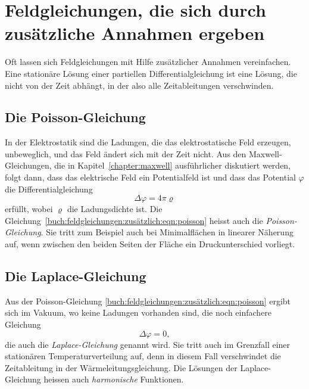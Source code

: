 %
%
\section{Feldgleichungen, die sich durch zusätzliche Annahmen ergeben}
Oft lassen sich Feldgleichungen mit Hilfe zusätzlicher Annahmen
vereinfachen.
Eine stationäre Lösung einer partiellen Differentialgleichung ist
eine Lösung, die nicht von der Zeit abhängt, in der also alle
Zeitableitungen verschwinden.

\subsection{Die Poisson-Gleichung}
In der Elektrostatik sind die Ladungen, die das elektrostatische
Feld erzeugen, unbeweglich, und das Feld ändert sich mit der Zeit
nicht.
Aus den Maxwell-Gleichungen, die in Kapitel~\ref{chapter:maxwell}
ausführlicher diskutiert werden, folgt dann, dass das elektrische
Feld ein Potentialfeld ist und dass das Potential $\varphi$ die
Differentialgleichung
\begin{equation}
\Delta \varphi = 4\pi \varrho
\label{buch:feldgleichungen:zusätzlich:eqn:poisson}
\end{equation}
erfüllt, wobei $\varrho$ die Ladungsdichte ist.
Die Gleichung~\eqref{buch:feldgleichungen:zusätzlich:eqn:poisson}
heisst auch die {\em Poisson-Glei\-chung}.
%
Sie tritt zum Beispiel auch bei Minimalflächen in linearer Näherung
auf, wenn zwischen den beiden Seiten der Fläche ein Druckunterschied
vorliegt.

\subsection{Die Laplace-Gleichung}
Aus der Poisson-Gleichung \eqref{buch:feldgleichungen:zusätzlich:eqn:poisson}
ergibt sich im Vakuum, wo keine Ladungen vorhanden sind, die noch
einfachere Gleichung
\[
\Delta \varphi = 0,
\]
die auch die {\em Laplace-Gleichung} genannt wird.
%
Sie tritt auch im Grenzfall einer stationären Temperaturverteilung
auf, denn in diesem Fall verschwindet die Zeitableitung in der
Wärmeleitungsgleichung.
Die Lösungen der Laplace-Gleichung heissen auch {\em harmonische} 
Funktionen.

